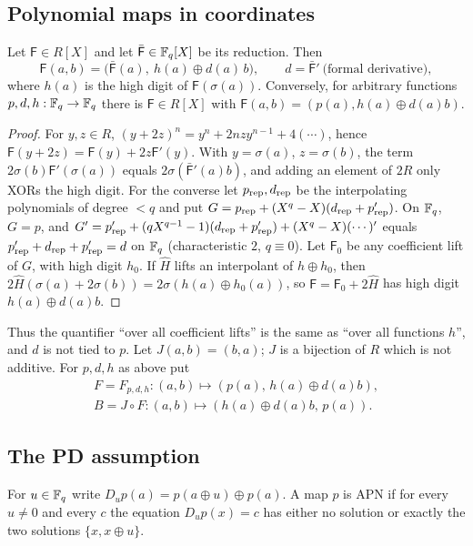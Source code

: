 \subsection{Polynomial maps in coordinates}
\begin{proposition}\label{prop:realize}
Let $\mathsf F\in R[X]$ and let $\bar{\mathsf F}\in\mathbb{F}_q[X]$ be its reduction. Then
\[
\mathsf F(a,b)=\bigl(\bar{\mathsf F}(a),\ h(a)\oplus d(a)\,b\bigr),\qquad d=\bar{\mathsf F}'\ \text{(formal derivative)},
\]
where $h(a)$ is the high digit of $\mathsf F(\sigma(a))$. Conversely, for arbitrary functions
$p,d,h:\mathbb{F}_q\to\mathbb{F}_q$ there is $\mathsf F\in R[X]$ with $\mathsf F(a,b)=(p(a),h(a)\oplus d(a)b)$.
\end{proposition}
\begin{proof}
For $y,z\in R$, $(y+2z)^n=y^n+2nzy^{n-1}+4(\cdots)$, hence $\mathsf F(y+2z)=\mathsf F(y)+2z\mathsf F'(y)$.
With $y=\sigma(a)$, $z=\sigma(b)$, the term $2\sigma(b)\mathsf F'(\sigma(a))$ equals $2\sigma(\bar{\mathsf F}'(a)b)$, and adding
an element of $2R$ only XORs the high digit. For the converse let $p_{\rm rep},d_{\rm rep}$ be the
interpolating polynomials of degree $<q$ and put $G=p_{\rm rep}+(X^q-X)(d_{\rm rep}+p_{\rm rep}')$. On $\mathbb{F}_q$,
$G=p$, and $G'=p'_{\rm rep}+(qX^{q-1}-1)(d_{\rm rep}+p'_{\rm rep})+(X^q-X)(\cdots)'$ equals
$p'_{\rm rep}+d_{\rm rep}+p'_{\rm rep}=d$ on $\mathbb{F}_q$ (characteristic $2$, $q\equiv0$). Let $\mathsf F_0$ be any
coefficient lift of $G$, with high digit $h_0$. If $\hat H$ lifts an interpolant of $h\oplus h_0$,
then $2\hat H(\sigma(a)+2\sigma(b))=2\sigma(h(a)\oplus h_0(a))$, so $\mathsf F=\mathsf F_0+2\hat H$ has high digit
$h(a)\oplus d(a)b$.
\end{proof}

Thus the quantifier ``over all coefficient lifts'' is the same as ``over all functions $h$'', and
$d$ is not tied to $p$. Let $J(a,b)=(b,a)$; $J$ is a bijection of $R$ which is not additive.
For $p,d,h$ as above put
\begin{gather*}
F=F_{p,d,h}:(a,b)\mapsto (p(a),\,h(a)\oplus d(a)b),\\
B=J\circ F:(a,b)\mapsto(h(a)\oplus d(a)b,\,p(a)).
\end{gather*}

\subsection{The PD assumption}
For $u\in\mathbb{F}_q$ write $D_up(a)=p(a\oplus u)\oplus p(a)$. A map $p$ is APN if for every $u\ne0$ and
every $c$ the equation $D_up(x)=c$ has either no solution or exactly the two solutions
$\{x,x\oplus u\}$.

